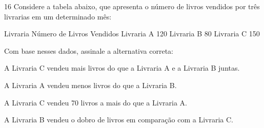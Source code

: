 




\num{16} Considere a tabela abaixo, que apresenta o número de livros vendidos
por três livrarias em um determinado mês:


Livraria Número de Livros Vendidos Livraria A 120 Livraria B 80 Livraria
C 150

Com base nesses dados, assinale a alternativa correta:
\item A Livraria C vendeu mais livros do que a Livraria A e a Livraria B
juntas.
\item A Livraria A vendeu menos livros do que a Livraria B.
\item A Livraria C vendeu 70 livros a mais do que a Livraria A.
\item A Livraria B vendeu o dobro de livros em comparação com a Livraria C.




